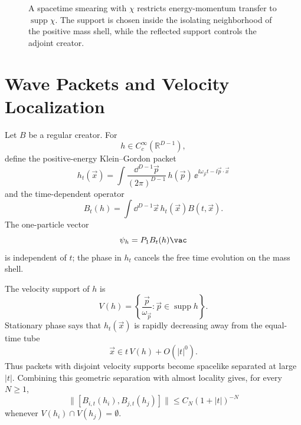 \begin{figure}[H]
  \centering
  \caption{A spacetime smearing with \(\chi\) restricts energy-momentum
  transfer to \(\operatorname{supp}\widehat\chi\).  The support is chosen
  inside the isolating neighborhood of the positive mass shell, while the
  reflected support controls the adjoint creator.}
  \label{fig:haag-ruelle-spectral-transfer}
\end{figure}

\section{Wave Packets and Velocity Localization}

Let \(B\) be a regular creator.  For
\[
  h\in C_c^\infty(\mathbb R^{D-1}),
\]
define the positive-energy Klein--Gordon packet
\[
  h_t(\vec x)
  =
  \int\frac{\dd^{D-1}\vec p}{(2\pi)^{D-1}}\,
  h(\vec p)\,
  \ee^{\ii\omega_{\vec p}t-\ii\vec p\cdot\vec x}
\]
and the time-dependent operator
\[
  B_t(h)=\int\dd^{D-1}\vec x\,h_t(\vec x)B(t,\vec x).
\]
The one-particle vector
\[
  \psi_h=P_1B_t(h)\vac
\]
is independent of \(t\); the phase in \(h_t\) cancels the free time evolution
on the mass shell.

The velocity support of \(h\) is
\[
  V(h)=
  \left\{
    \frac{\vec p}{\omega_{\vec p}}:
    \vec p\in\operatorname{supp}h
  \right\}.
\]
Stationary phase says that \(h_t(\vec x)\) is rapidly decreasing away from
the equal-time tube
\[
  \vec x\in t\,V(h)+O(|t|^0).
\]
Thus packets with disjoint velocity supports become spacelike separated at
large \(|t|\).  Combining this geometric separation with almost locality
gives, for every \(N\ge1\),
\begin{equation}
  \|[B_{i,t}(h_i),B_{j,t}(h_j)]\|
  \le C_N(1+|t|)^{-N}
  \label{eq:algebraic-haag-ruelle-commutator}
\end{equation}
whenever \(V(h_i)\cap V(h_j)=\emptyset\).

